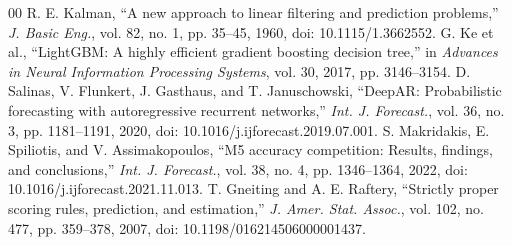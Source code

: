 \documentclass[conference]{IEEEtran}
\begin{document}
\balance
\begin{thebibliography}{00}
 R. E. Kalman, ``A new approach to linear filtering and prediction problems,'' \emph{J. Basic Eng.}, vol. 82, no. 1, pp. 35--45, 1960, doi: 10.1115/1.3662552.
 G. Ke et al., ``LightGBM: A highly efficient gradient boosting decision tree,'' in \emph{Advances in Neural Information Processing Systems}, vol. 30, 2017, pp. 3146--3154.
 D. Salinas, V. Flunkert, J. Gasthaus, and T. Januschowski, ``DeepAR: Probabilistic forecasting with autoregressive recurrent networks,'' \emph{Int. J. Forecast.}, vol. 36, no. 3, pp. 1181--1191, 2020, doi: 10.1016/j.ijforecast.2019.07.001.
 S. Makridakis, E. Spiliotis, and V. Assimakopoulos, ``M5 accuracy competition: Results, findings, and conclusions,'' \emph{Int. J. Forecast.}, vol. 38, no. 4, pp. 1346--1364, 2022, doi: 10.1016/j.ijforecast.2021.11.013.
 T. Gneiting and A. E. Raftery, ``Strictly proper scoring rules, prediction, and estimation,'' \emph{J. Amer. Stat. Assoc.}, vol. 102, no. 477, pp. 359--378, 2007, doi: 10.1198/016214506000001437.
\end{thebibliography}
\end{document}
